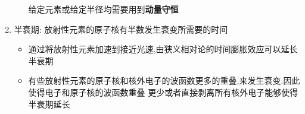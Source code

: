 \documentclass{article}
\begin{document}
\begin{enumerate}
\begin{itemize}
                  \hspace*{5em}给定元素或给定半径均需要用到\textbf{动量守恒}
          \end{itemize}

          \vspace*{2em}

    \item 半衰期: 放射性元素的原子核有半数发生衰变所需要的时间\vspace{-1em}

          \begin{adjustbox}{minipage=0.91\linewidth, bgcolor=gray!20, padding=1em}
              \small %
              \begin{itemize}
                  \item 通过将放射性元素加速到接近光速,由狭义相对论的时间膨胀效应可以延长半衰期
                  \item 有些放射性元素的原子核和核外电子的波函数更多的重叠,来发生衰变.因此使得电子和原子核的波函数重叠
                        更少或者直接剥离所有核外电子能够使得半衰期延长
              \end{itemize}
          \end{adjustbox}

          \vspace{-1em}

          \vspace*{2em}


\end{enumerate}
\end{document}
